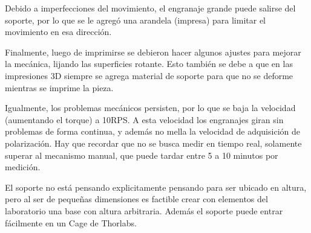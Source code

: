 Debido a imperfecciones del movimiento, el engranaje grande puede salirse del soporte, por lo que se le agregó una arandela (impresa) para limitar el movimiento en esa dirección. 

Finalmente, luego de imprimirse se debieron hacer algunos ajustes para mejorar la mecánica, lijando las superficies rotante. Esto también se debe a que en las impresiones 3D siempre se agrega material de soporte para que no se deforme mientras se imprime la pieza.

Igualmente, los problemas mecánicos persisten, por lo que se baja la velocidad (aumentando el torque) a 10RPS. A esta velocidad los engranajes giran sin problemas de forma continua, y además no mella la velocidad de adquisición de polarización. Hay que recordar que no se busca medir en tiempo real, solamente superar al mecanismo manual, que puede tardar entre 5 a 10 minutos por medición.

El soporte no está pensando explicitamente pensando para ser ubicado en altura, pero al ser de pequeñas dimensiones es factible crear con elementos del laboratorio una base con altura arbitraria. Además el soporte puede entrar fácilmente en un Cage de Thorlabs.
